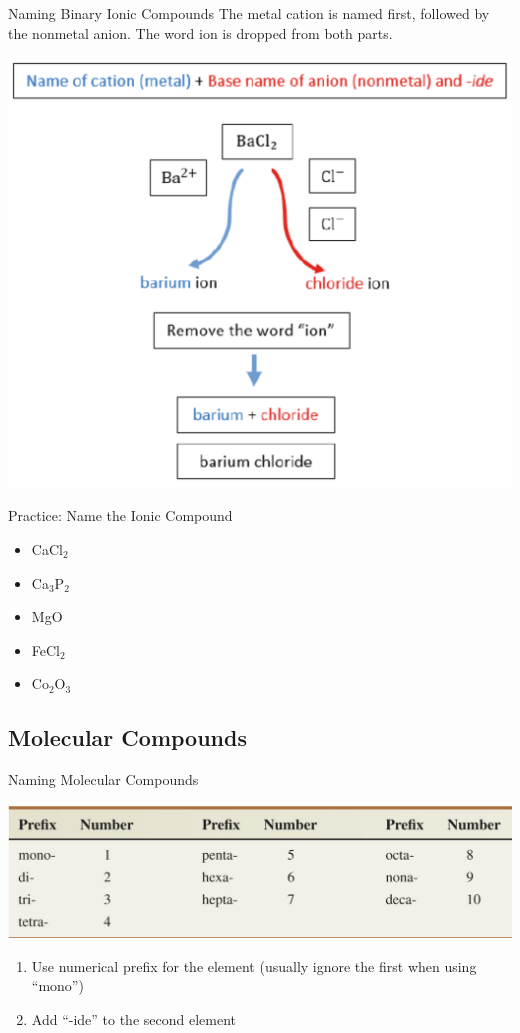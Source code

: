 \documentclass[11pt]{beamer}
\begin{document}
\begin{frame}{Naming Binary Ionic Compounds}
  The metal cation is named first, followed by the nonmetal anion.
  The word ion is dropped from both parts.

  \centering
  \includegraphics[width=0.7\linewidth]{barium_examp.png}
\end{frame}

\begin{frame}{Practice: Name the Ionic Compound}
  \begin{itemize}
  \item CaCl$_2$
  \item Ca$_3$P$_2$
  \item MgO
  \item FeCl$_2$
  \item Co$_2$O$_3$
  \end{itemize}
\end{frame}

\subsection{Molecular Compounds}

\begin{frame}{Naming Molecular Compounds}
  \begin{center}
    \includegraphics[width=\linewidth]{prefix_name}
  \end{center}
  
  \begin{enumerate}
  \item Use numerical prefix for the element (usually ignore the first
    when using ``mono'')
  \item Add ``-ide'' to the second element
  \end{enumerate}
\end{frame}
\end{document}
